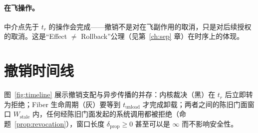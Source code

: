 \paragraph{在飞操作。}
中介点先于 $t_r$ 的操作会完成——撤销不是对在飞副作用的取消，只是对后续授权的取消。这是“Effect $\neq$ Rollback”公理（见第~\ref{ch:sep} 章）在时序上的体现。

\section{撤销时间线}

图~\ref{fig:timeline} 展示撤销支配与异步传播的并存：内核裁决（黑）在 $t_r$ 后立即转为拒绝；Fiber 生命周期（灰）要等到 $t_{\mathrm{unload}}$ 才完成卸载；两者之间的陈旧门面窗口 $W_{\mathrm{stale}}$ 内，任何经陈旧门面发起的系统调用都被拒绝（命题~\ref{prop:revocation}），窗口长度 $\delta_{\mathrm{prop}}\ge 0$ 甚至可以是 $\infty$ 而不影响安全性。


